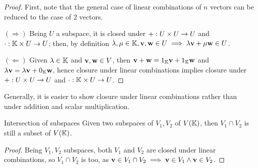 \begin{proofbox}
  \begin{proof}
    First, note that the general case of linear combinations of $ n $ vectors can be reduced to the case of $ 2 $ vectors.

    $ (\Rightarrow) $ Being $ U $ a subspace, it is closed under $ + : U \times U \rightarrow U $ and $ \cdot : \mathbb{K} \times U \rightarrow U $; then, by definition $ \lambda , \mu \in \mathbb{K} , \mathbf{v} , \mathbf{w} \in U \implies \lambda \mathbf{v} + \mu \mathbf{w} \in U $.

    $ (\Leftarrow) $ Given $ \lambda \in \mathbb{K} $ and $ \mathbf{v} , \mathbf{w} \in V $, then $ \mathbf{v} + \mathbf{w} = 1_{\mathbb{K}} \mathbf{v} + 1_{\mathbb{K}} \mathbf{w} $ and $ \lambda \mathbf{v} = \lambda \mathbf{v} + 0_{\mathbb{K}} \mathbf{w} $, hence closure under linear combinations implies closure under $ + : U \times U \rightarrow U $ and $ \cdot : \mathbb{K} \times U \rightarrow U $.
  \end{proof}
\end{proofbox}

Generally, it is easier to show closure under linear combinations rather than under addition and scalar multiplication.

\begin{lemma}{Intersection of subspaces}{}
  Given two subspaces of $ V_1 , V_2 $ of $ V(\mathbb{K}) $, then $ V_1 \cap V_2 $ is still a subset of $ V(\mathbb{K}) $.
\end{lemma}

\begin{proofbox}
  \begin{proof}
    Being $ V_1 , V_2 $ subspaces, both $ V_1 $ and $ V_2 $ are closed under linear combinations, so $ V_1 \cap V_2 $ is too, as $ \mathbf{v} \in V_1 \cap V_2 \implies \mathbf{v} \in V_1 \land \mathbf{v} \in V_2 $.
  \end{proof}
\end{proofbox}

